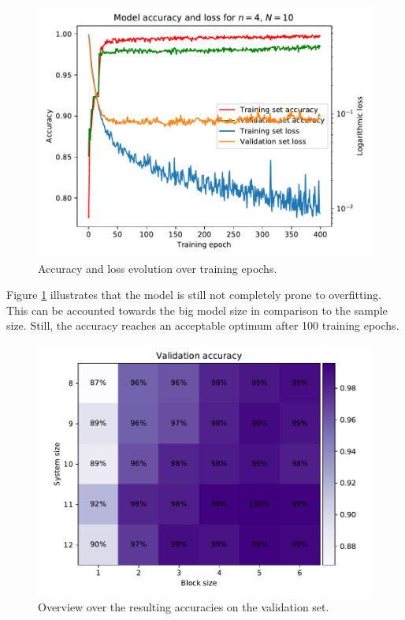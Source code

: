 \documentclass[reprint,amsmath,amssymb,aps,prb]{revtex4-2}
\begin{document}
\begin{figure}[h!]
	\centering
	\includegraphics[width=\linewidth]{../results/accuracy_loss_epochs/N10n4_accuracy_loss_epochs}
	\caption{Accuracy and loss evolution over training epochs.}
	\label{fig:N10n4_accuracy_loss_epochs}
\end{figure}

Figure \ref{fig:N10n4_accuracy_loss_epochs} illustrates that the model is still not completely prone to overfitting. This can be accounted towards the big model size in comparison to the sample size. Still, the accuracy reaches an acceptable optimum after 100 training epochs.%

\begin{figure}[h!]
	\centering
	\includegraphics[width=\linewidth]{../results/accuracy_loss_epochs/all_validation_accuracy}
	\caption{Overview over the resulting accuracies on the validation set.}
	\label{fig:all_validation_accuracy}
\end{figure}
\end{document}
